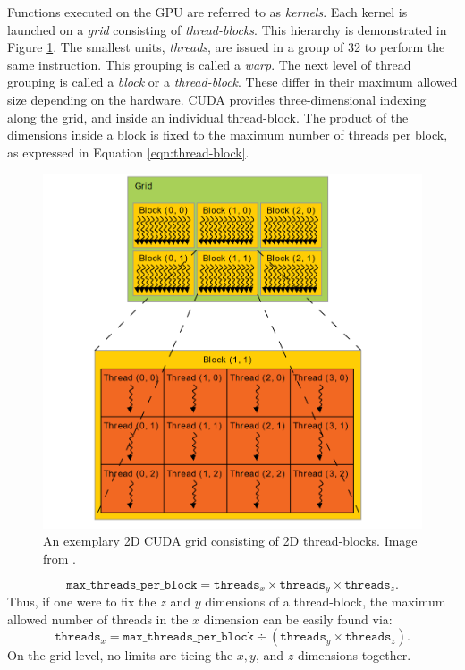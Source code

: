 \documentclass{juliacon}
\begin{document}
Functions executed on the GPU are referred to as \emph{kernels}. Each kernel is launched on a \emph{grid} consisting of \emph{thread-blocks}. This hierarchy is demonstrated in Figure \ref{fig:cuda-grid}. The smallest units, \emph{threads}, are issued in a group of 32 to perform the same instruction. This grouping is called a \emph{warp}. The next level of thread grouping is called a \emph{block} or a \emph{thread-block}. These differ in their maximum allowed size depending on the hardware. CUDA provides three-dimensional indexing along the grid, and inside an individual thread-block. The product of the dimensions inside a block is fixed to the maximum number of threads per block, as expressed in Equation \ref{eqn:thread-block}.
\begin{figure}[h] 
    \centering
    \includegraphics[scale=.4]{cuda-grid}
    \caption{An exemplary 2D CUDA grid consisting of 2D thread-blocks. Image from \cite{NVIDIA2022}.}
    \label{fig:cuda-grid}
\end{figure}
\begin{equation}\label{eqn:thread-block}
    \mathrm{\texttt{max\_threads\_per\_block}} = \mathrm{\texttt{threads}}_x \times \mathrm{\texttt{threads}}_y \times \mathrm{\texttt{threads}}_z.
\end{equation}
Thus, if one were to fix the $z$ and $y$ dimensions of a thread-block, the maximum allowed number of threads in the $x$ dimension can be easily found via:
\begin{equation}
    \mathrm{\texttt{threads}}_x = \mathrm{\texttt{max\_threads\_per\_block}} \div (\mathrm{\texttt{threads}}_y \times \mathrm{\texttt{threads}}_z).
\end{equation}
On the grid level, no limits are tieing the $x, y$, and $z$ dimensions together. 
\end{document}
